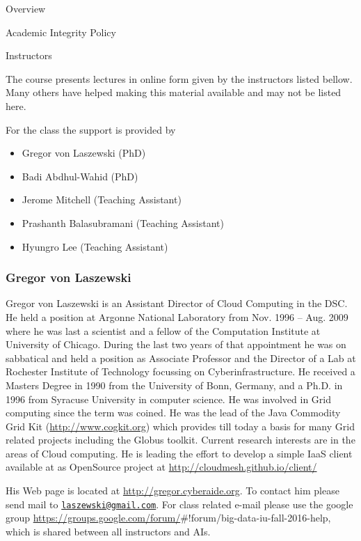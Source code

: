 \begin{edXchapter}{Overview}
\begin{edXsection}{Academic Integrity Policy}
\end{edXsection}
\begin{edXsection}{Instructors}\label{instructors}

The course presents lectures in online form given by the instructors
listed bellow. Many others have helped making this material available
and may not be listed here.

For the class the support is provided by

\begin{itemize}
\itemsep1pt\parskip0pt
\item
  Gregor von Laszewski (PhD)
\item
  Badi Abdhul-Wahid (PhD)
\item
  Jerome Mitchell (Teaching Assistant)
\item
  Prashanth Balasubramani (Teaching Assistant)
\item
  Hyungro Lee (Teaching Assistant)
\end{itemize}

\subsubsection{Gregor von Laszewski}\label{gregor-von-laszewski}


Gregor von Laszewski is an Assistant Director of Cloud Computing in the
DSC. He held a position at Argonne National Laboratory from Nov. 1996 --
Aug. 2009 where he was last a scientist and a fellow of the Computation
Institute at University of Chicago. During the last two years of that
appointment he was on sabbatical and held a position as Associate
Professor and the Director of a Lab at Rochester Institute of Technology
focussing on Cyberinfrastructure. He received a Masters Degree in 1990
from the University of Bonn, Germany, and a Ph.D. in 1996 from Syracuse
University in computer science. He was involved in Grid computing since
the term was coined. He was the lead of the Java Commodity Grid Kit
(\url{http://www.cogkit.org}) which provides till today a basis for many
Grid related projects including the Globus toolkit. Current research
interests are in the areas of Cloud computing. He is leading the effort
to develop a simple IaaS client available at as OpenSource project at
\url{http://cloudmesh.github.io/client/}

His Web page is located at \url{http://gregor.cyberaide.org}. To contact
him please send mail to
\href{mailto:laszewski@gmail.com}{\nolinkurl{laszewski@gmail.com}}. For
class related e-mail please use the google group
\url{https://groups.google.com/forum/}\#!forum/big-data-iu-fall-2016-help,
which is shared between all instructors and AIs.


\end{edXsection}
\end{edXchapter}
